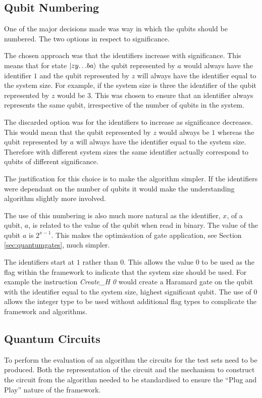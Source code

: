 \subsection{Qubit Numbering}
\label{sec:qubitnum}
One of the major decisions made was way in which the qubits should be numbered.
The two options in respect to significance.

The chosen approach was that the identifiers increase with significance.
This means that for state $\left\vert{zy{\dots}ba}\right\rangle$ the qubit represented by $a$ would always have the identifier $1$ and the qubit represented by $z$ will always have the identifier equal to the system size.
For example, if the system size is three the identifier of the qubit represented by $z$ would be $3$.
This was chosen to ensure that an identifier always represents the same qubit, irrespective of the number of qubits in the system.

The discarded option was for the identifiers to increase as significance decreases.
This would mean that the qubit represented by $z$ would always be $1$ whereas the qubit represented by $a$ will always have the identifier equal to the system size.
Therefore with different system sizes the same identifier actually correspond to qubits of different  significance.

The justification for this choice is to make the algorithm simpler.
If the identifiers were dependant on the number of qubits it would make the understanding algorithm slightly more involved.

The use of this numbering is also much more natural as the identifier, $x$, of a qubit, $a$, is related to the value of the qubit when read in binary.
The value of the qubit $a$ is $2^{x-1}$.
This makes the optimisation of gate application, see Section \ref{sec:quantumgates}, much simpler.

The identifiers start at $1$ rather than $0$.
This allows the value $0$ to be used as the flag within the framework to indicate that the system size should be used.
For example the instruction \emph{Create\_H 0} would create a Haramard gate on the qubit with the identifier equal to the system size, highest significant qubit.
The use of $0$ allows the integer type to be used without additional flag types to complicate the framework and algorithms.

\subsection{Quantum Circuits}
\label{sec:quantumcircuits}
To perform the evaluation of an algorithm the circuits for the test sets need to be produced.
Both the representation of the circuit and the mechanism to construct the circuit from the algorithm needed to be standardised to ensure the ``Plug and Play'' nature of the framework.

